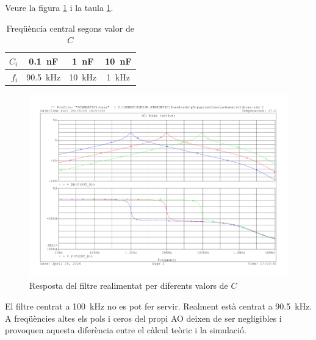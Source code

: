 \documentclass[catalan, a4paper, nobib]{tufte-handout}
\begin{document}
\newpage

 Veure la figura \ref{fig:variable_c} i la taula \ref{tab:variable_c}.

\begin{table}[!h]
    \begin{center}
      \begin{tabular}{@{}rccc@{}}
        \toprule
        $C_i$ & \qty{0.1}{\nano\farad} & \qty{1}{\nano\farad} & \qty{10}{\nano\farad} \\
        \midrule
        $f_i$ & \qty{90.5}{\kilo\hertz} & \qty{10}{\kilo\hertz} & \qty{1}{\kilo\hertz} \\
        \bottomrule
      \end{tabular}
    \end{center}
    \caption{Freqüència central segons valor de $C$}
    \label{tab:variable_c}
\end{table}

\begin{figure}[!h]
    \begin{center}
        \includegraphics[width=465px]{3.pdf}
    \end{center}
    \caption{Resposta del filtre realimentat per diferents valors de $C$}
    \label{fig:variable_c}
\end{figure}

 El filtre centrat a \qty{100}{\kilo\hertz} no es pot fer servir. Realment està centrat a \qty{90.5}{\kilo\hertz}. A freqüències altes els pols i ceros del propi AO deixen de ser negligibles i provoquen aquesta diferència entre el càlcul teòric i la simulació.

\newpage
\end{document}
